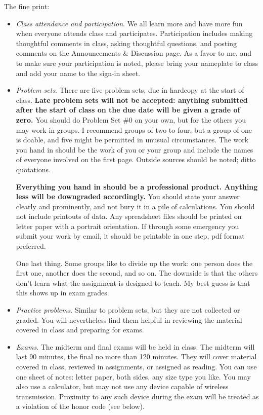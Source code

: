 \documentclass[12pt]{article}
\begin{document}
The fine print:
\begin{itemize}

\item \textit{Class attendance and participation}.
We all learn more and have more fun when everyone attends class and participates.
Participation includes making thoughtful comments in class,
asking thoughtful questions,
and posting comments on the Announcements \& Discussion page.
As a favor to me, and to make sure your participation is noted,
please bring your nameplate to class and add your name to the
sign-in sheet.

\item \textit{Problem sets}.
There are five problem sets,
due in hardcopy at the start of class.
{\bf Late problem sets will not be accepted:
anything submitted after the start of class on the due date will be given a grade of zero.}
You should do Problem Set \#0 on your own,
but for the others you may work in groups.
I recommend groups of two to four,
but a group of one is doable, and five might be permitted in unusual circumstances.
The work you hand in should be the work of you or your group
and include the names of everyone involved on the first page.
Outside sources should be noted; ditto quotations.

{\bf Everything you hand in should be a  professional product.
Anything less will be downgraded accordingly.}
You should state your answer clearly and prominently,
and not bury it in a pile of calculations.
You should not include printouts of data.
Any spreadsheet files should be printed on letter paper
with a portrait orientation.
If through some emergency you submit your work by email,
it should be printable in one step,
pdf format preferred.

One last thing.  Some groups like to divide up the work:
one person does the first one, another does the second, and so on.
The downside is that the others don't learn what the assignment is designed
to teach.
My best guess is that this shows up in exam grades. 


\item \textit{Practice problems}.
Similar to problem sets, but they are not collected or graded.
You will nevertheless find them helpful in reviewing the
material covered in class and preparing for exams.


\item \textit{Exams}.
The midterm and final exams will be held in class.
The midterm will last 90 minutes, the final no more than 120 minutes.
They will cover material covered in class, reviewed in assignments,
or assigned as reading.
You can use one sheet of notes: letter paper, both sides, any size type you like.
You may also use a calculator, but may not use any device
capable of wireless transmission.  Proximity to any such
device during the exam will be treated as a violation of the honor
code (see below).


\end{itemize}
\end{document}
